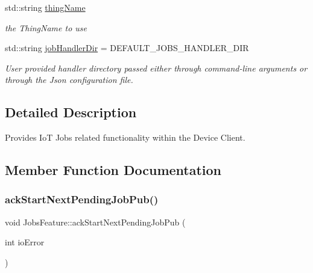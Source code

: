 \begin{DoxyCompactItemize}
\mbox{\label{class_aws_1_1_iot_1_1_device_client_1_1_jobs_1_1_jobs_feature_a10d7baa43855fc9d73404ddfc03eb347}} 
std\+::string \hyperlink{class_aws_1_1_iot_1_1_device_client_1_1_jobs_1_1_jobs_feature_a10d7baa43855fc9d73404ddfc03eb347}{thing\+Name}
\begin{DoxyCompactList}\small\item\em the Thing\+Name to use \end{DoxyCompactList}\item 
\mbox{\label{class_aws_1_1_iot_1_1_device_client_1_1_jobs_1_1_jobs_feature_a37030f5e63e8d42448dab3a0dd70d7b2}} 
std\+::string \hyperlink{class_aws_1_1_iot_1_1_device_client_1_1_jobs_1_1_jobs_feature_a37030f5e63e8d42448dab3a0dd70d7b2}{job\+Handler\+Dir} = D\+E\+F\+A\+U\+L\+T\+\_\+\+J\+O\+B\+S\+\_\+\+H\+A\+N\+D\+L\+E\+R\+\_\+\+D\+IR
\begin{DoxyCompactList}\small\item\em User provided handler directory passed either through command-\/line arguments or through the Json configuration file. \end{DoxyCompactList}\end{DoxyCompactItemize}


\subsection{Detailed Description}
Provides IoT Jobs related functionality within the Device Client. 

\subsection{Member Function Documentation}
\mbox{\label{class_aws_1_1_iot_1_1_device_client_1_1_jobs_1_1_jobs_feature_a63306a1777aae7bb64a3e80bc1285d72}} 
\subsubsection{\texorpdfstring{ack\+Start\+Next\+Pending\+Job\+Pub()}{ackStartNextPendingJobPub()}}
{\footnotesize\ttfamily void Jobs\+Feature\+::ack\+Start\+Next\+Pending\+Job\+Pub (\begin{DoxyParamCaption}\item[{int}]{io\+Error }\end{DoxyParamCaption})\hspace{0.3cm}{\ttfamily [private]}}



